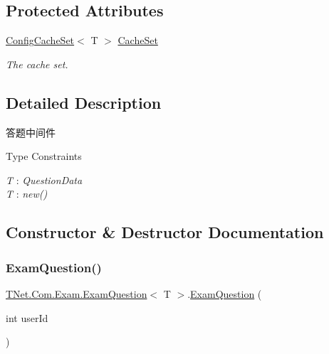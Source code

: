\subsection*{Protected Attributes}
\begin{DoxyCompactItemize}
\item 
\mbox{\hyperlink{class_t_net_1_1_cache_1_1_config_cache_set}{Config\+Cache\+Set}}$<$ T $>$ \mbox{\hyperlink{class_t_net_1_1_com_1_1_exam_1_1_exam_question_a3dd49fbd2aa337ce366d5d36b096a458}{Cache\+Set}}
\begin{DoxyCompactList}\small\item\em The cache set. \end{DoxyCompactList}\end{DoxyCompactItemize}


\subsection{Detailed Description}
答题中间件 

\begin{Desc}
\item[Type Constraints]\begin{description}
\item[{\em T} : {\em Question\+Data}]\item[{\em T} : {\em new()}]\end{description}
\end{Desc}


\subsection{Constructor \& Destructor Documentation}
\mbox{\label{class_t_net_1_1_com_1_1_exam_1_1_exam_question_a0797783e49d7716c88ddb5ba30e9b6e4}} 
\subsubsection{\texorpdfstring{Exam\+Question()}{ExamQuestion()}}
{\footnotesize\ttfamily \mbox{\hyperlink{class_t_net_1_1_com_1_1_exam_1_1_exam_question}{T\+Net.\+Com.\+Exam.\+Exam\+Question}}$<$ T $>$.\mbox{\hyperlink{class_t_net_1_1_com_1_1_exam_1_1_exam_question}{Exam\+Question}} (\begin{DoxyParamCaption}\item[{int}]{user\+Id }\end{DoxyParamCaption})\hspace{0.3cm}{\ttfamily [protected]}}






